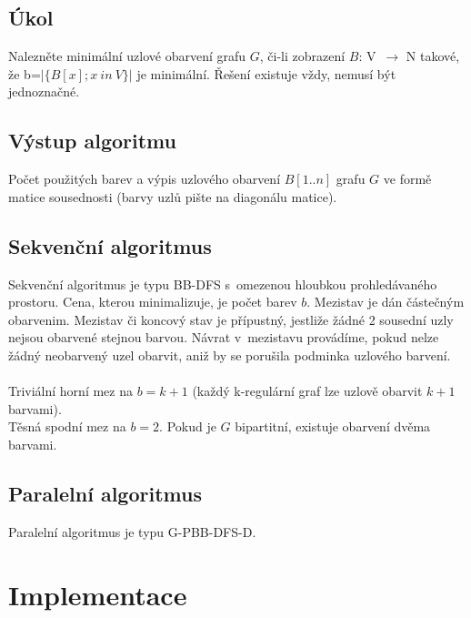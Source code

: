 \documentclass[12pt]{article}
\begin{document}
\subsection{Úkol} 

Nalezněte minimální uzlové obarvení grafu $G$, či-li zobrazení $B$: V~$\rightarrow$ N takové, že b=$\left|\{B[x]; x\ in\ V\}\right|$ je minimální. Řešení existuje vždy, nemusí být jednoznačné.

\subsection{Výstup algoritmu}

Počet použitých barev a výpis uzlového obarvení $B[1..n]$ grafu $G$ ve formě matice sousednosti (barvy uzlů pište na diagonálu matice).\\

\subsection{Sekvenční algoritmus}

Sekvenční algoritmus je typu BB-DFS s~omezenou hloubkou prohledávaného prostoru. Cena, kterou minimalizuje, je počet barev $b$. Mezistav je dán částečným obarvenim. Mezistav či koncový stav je přípustný, jestliže žádné 2 sousední uzly nejsou obarvené stejnou barvou. Návrat v~mezistavu provádíme, pokud nelze žádný neobarvený uzel obarvit, aniž by se porušila podminka uzlového barvení.\\
\\
Triviální horní mez na $b=k+1$ (každý k-regulární graf lze uzlově obarvit $k+1$ barvami).\\
Těsná spodní mez na $b=2$. Pokud je $G$ bipartitní, existuje obarvení dvěma barvami.


\subsection{Paralelní algoritmus}

Paralelní algoritmus je typu G-PBB-DFS-D. 

\section{Implementace}
\end{document}

